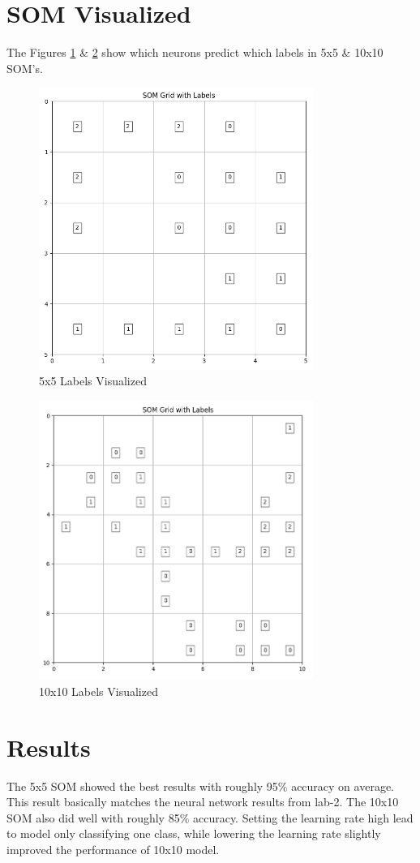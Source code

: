 \documentclass{article}
\begin{document}
\section*{SOM Visualized}
The Figures \ref{fig:5-labels} \& \ref{fig:10-labels} show which neurons predict which labels in 5x5 \& 10x10 SOM's.
\begin{figure}[H]
    \centering
    \includegraphics[width=0.8\textwidth]{5-labels.png}
    \caption{5x5 Labels Visualized}
    \label{fig:5-labels}
\end{figure}
\begin{figure}[H]
    \centering
    \includegraphics[width=0.8\textwidth]{10-labels.png}
    \caption{10x10 Labels Visualized}
    \label{fig:10-labels}
\end{figure}

\section*{Results}
The 5x5 SOM showed the best results with roughly 95\% accuracy on average. This result basically matches the neural network results from lab-2. The 10x10 SOM also did well with roughly 85\% accuracy. Setting the learning rate high lead to model only classifying one class, while lowering the learning rate slightly improved the performance of 10x10 model.
\end{document}
